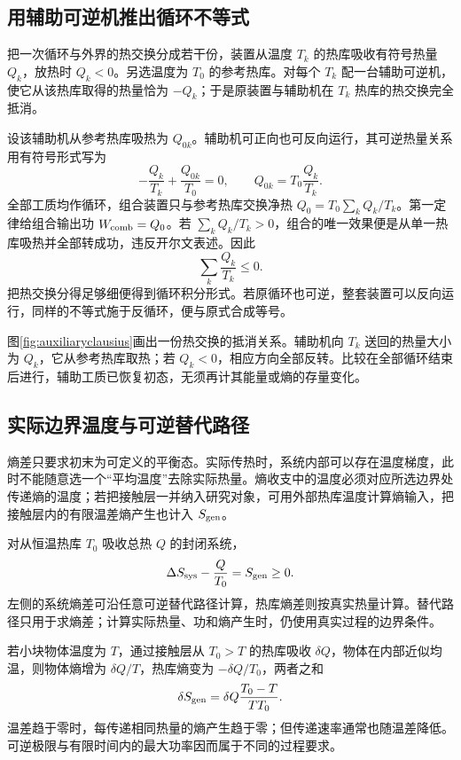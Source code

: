 \subsection{用辅助可逆机推出循环不等式}
\label{th:clausiusconstruction}
把一次循环与外界的热交换分成若干份，装置从温度 $T_k$ 的热库吸收有符号热量 $Q_k$，放热时 $Q_k<0$。另选温度为 $T_0$ 的参考热库。对每个 $T_k$ 配一台辅助可逆机，使它从该热库取得的热量恰为 $-Q_k$；于是原装置与辅助机在 $T_k$ 热库的热交换完全抵消。

设该辅助机从参考热库吸热为 $Q_{0k}$。辅助机可正向也可反向运行，其可逆热量关系用有符号形式写为
\[
 -\frac{Q_k}{T_k}+\frac{Q_{0k}}{T_0}=0,
 \qquad Q_{0k}=T_0\frac{Q_k}{T_k}.
\]
全部工质均作循环，组合装置只与参考热库交换净热
$Q_0=T_0\sum_kQ_k/T_k$。第一定律给组合输出功 $W_{\rm comb}=Q_0$。若 $\sum_kQ_k/T_k>0$，组合的唯一效果便是从单一热库吸热并全部转成功，违反开尔文表述。因此
\[
 \sum_k\frac{Q_k}{T_k}\le0.
\]
把热交换分得足够细便得到循环积分形式。若原循环也可逆，整套装置可以反向运行，同样的不等式施于反循环，便与原式合成等号。

图\ref{fig:auxiliaryclausius}画出一份热交换的抵消关系。辅助机向 $T_k$ 送回的热量大小为 $Q_k$，它从参考热库取热；若 $Q_k<0$，相应方向全部反转。比较在全部循环结束后进行，辅助工质已恢复初态，无须再计其能量或熵的存量变化。

\subsection{实际边界温度与可逆替代路径}
熵差只要求初末为可定义的平衡态。实际传热时，系统内部可以存在温度梯度，此时不能随意选一个“平均温度”去除实际热量。熵收支中的温度必须对应所选边界处传递熵的温度；若把接触层一并纳入研究对象，可用外部热库温度计算熵输入，把接触层内的有限温差熵产生也计入 $S_{\rm gen}$。

对从恒温热库 $T_0$ 吸收总热 $Q$ 的封闭系统，
\[
 \Delta S_{\rm sys}-\frac Q{T_0}=S_{\rm gen}\ge0.
\]
左侧的系统熵差可沿任意可逆替代路径计算，热库熵差则按真实热量计算。替代路径只用于求熵差；计算实际热量、功和熵产生时，仍使用真实过程的边界条件。

若小块物体温度为 $T$，通过接触层从 $T_0>T$ 的热库吸收 $\delta Q$，物体在内部近似均温，则物体熵增为 $\delta Q/T$，热库熵变为 $-\delta Q/T_0$，两者之和
\[
 \delta S_{\rm gen}
 =\delta Q\frac{T_0-T}{TT_0}.
\]
温差趋于零时，每传递相同热量的熵产生趋于零；但传递速率通常也随温差降低。可逆极限与有限时间内的最大功率因而属于不同的过程要求。

